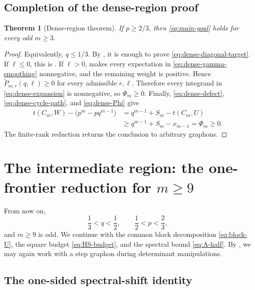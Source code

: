 \documentclass[11pt]{article}
\newtheorem{theorem}{Theorem}[section]
\begin{document}
\subsection{Completion of the dense-region proof}

\begin{theorem}[Dense-region theorem]\label{thm:dense-region}
If \(p\ge2/3\), then \eqref{eq:main-goal} holds for every odd \(m\ge3\).
\end{theorem}

\begin{proof}
Equivalently, \(q\le1/3\).  By
, it is enough to prove
\eqref{eq:dense-diagonal-target}.  If \(\ell\le0\), this is
.  If \(\ell>0\),
 makes every expectation in
\eqref{eq:dense-gamma-smoothing} nonnegative, and the remaining weight is
positive.  Hence \(\widetilde P_{m,r}(q,\ell)\ge0\) for every admissible
\(r,\ell\).  Therefore every integrand in \eqref{eq:dense-expansion} is
nonnegative, so \(\Phi_m\ge0\).  Finally,
\eqref{eq:dense-defect}, \eqref{eq:dense-cycle-path}, and \eqref{eq:dense-Phi} give
\[
\begin{aligned}
 t(C_m,W)-\bigl(p^m-pq^{m-1}\bigr)
 &=q^{m-1}+S_m-t(C_m,U)\\
 &\ge q^{m-1}+S_m-x_{m-1}=\Phi_m\ge0.
\end{aligned}
\]
The finite-rank reduction returns the conclusion to arbitrary graphons.
\end{proof}

\section{The intermediate region: the one-frontier reduction for \texorpdfstring{\(m\ge9\)}{m>=9}}
\label{sec:regionII-operator}

From now on,
\begin{equation}\label{eq:regionII}
       \frac13<q<\frac12,
       \qquad \frac12<p<\frac23,
\end{equation}
and \(m\ge9\) is odd.  We continue with the common block decomposition
\eqref{eq:block-U}, the square budget \eqref{eq:HS-budget}, and the spectral
bound \eqref{eq:A-half}.  By , we may again work
with a step graphon during determinant manipulations.
\subsection{The one-sided spectral-shift identity}\label{subsec:shift}
\end{document}
